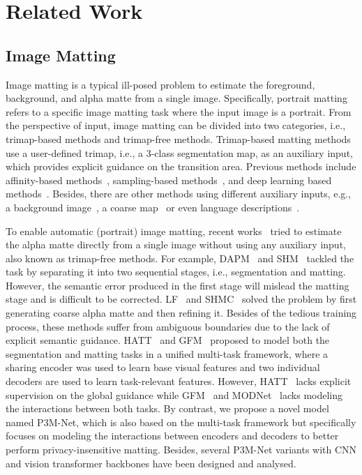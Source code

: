 \documentclass[twocolumn]{svjour3}
\begin{document}
\section{Related Work}\label{sec:lr}

\subsection{Image Matting}
Image matting is a typical ill-posed problem to estimate the foreground, background, and alpha matte from a single image. Specifically, portrait matting refers to a specific image matting task where the input image is a portrait. From the perspective of input, image matting can be divided into two categories, i.e., trimap-based methods and trimap-free methods. Trimap-based matting methods use a user-defined trimap, i.e., a 3-class segmentation map, as an auxiliary input, which provides explicit guidance on the transition area. Previous methods include affinity-based methods~\citep{levin2007closed,aksoy2018semantic}, sampling-based methods~\citep{he2011global,shahrian2013improving}, and deep learning based methods~\citep{lu2019indices,hou2019context,Sun2021SemanticIM, Liu2021TripartiteIM}. Besides, there are other methods using different auxiliary inputs, e.g., a background image~\citep{backgroundmatting,backgroundmattingv2}, a coarse map~\citep{yu2021mask,dai2022boosting} or even language descriptions~\citep{rim}.

To enable automatic (portrait) image matting, recent works~\citep{shm,lf,hatt,gfm,aim} tried to estimate the alpha matte directly from a single image without using any auxiliary input, also known as trimap-free methods. For example, DAPM~\citep{dapm} and SHM~\citep{shm} tackled the task by separating it into two sequential stages, i.e., segmentation and matting. However, the semantic error produced in the first stage will mislead the matting stage and is difficult to be corrected. LF~\citep{lf} and SHMC~\citep{shmc} solved the problem by first generating coarse alpha matte and then refining it. Besides of the tedious training process, these methods suffer from ambiguous boundaries due to the lack of explicit semantic guidance. HATT~\citep{hatt} and GFM~\citep{gfm} proposed to model both the segmentation and matting tasks in a unified multi-task framework, where a sharing encoder was used to learn base visual features and two individual decoders are used to learn task-relevant features. However, HATT~\citep{hatt} lacks explicit supervision on the global guidance while GFM~\citep{gfm} and MODNet~\citep{modnet} lacks modeling the interactions between both tasks. By contrast, we propose a novel model named P3M-Net, which is also based on the multi-task framework but specifically focuses on modeling the interactions between encoders and decoders to better perform privacy-insensitive matting. Besides, several P3M-Net variants with CNN and vision transformer backbones have been designed and analysed.
\end{document}

